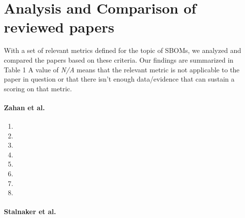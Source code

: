 \section{Analysis and Comparison of reviewed papers} \label{analysis}

\noindent With a set of relevant metrics defined for the topic of SBOMs, we analyzed and compared the papers based on these criteria. Our findings are summarized in Table 1 A value of \emph{N/A} means that the relevant metric is not applicable to the paper in question or that there isn't enough data/evidence that can sustain a scoring on that metric.

\paragraph{Zahan et al. \cite{article:sbom-required}}

\begin{enumerate}
    \item
    \item
    \item
    \item
    \item
    \item
    \item
    \item
\end{enumerate}

\paragraph{Stalnaker et al. \cite{article:software-bom}}

